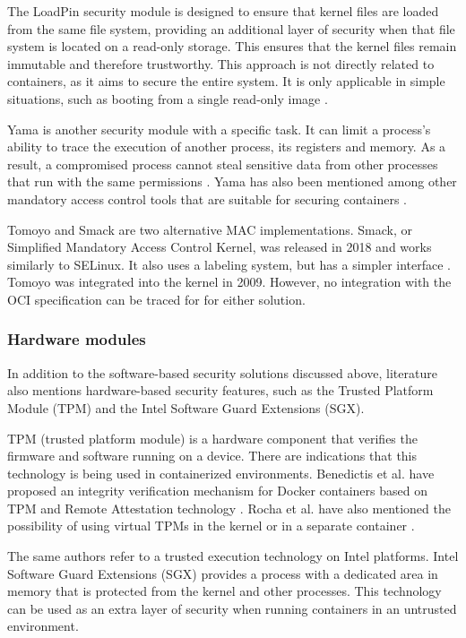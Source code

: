 The LoadPin security module is designed to ensure that kernel files are loaded from the same file system, providing an additional layer of security when that file system is located on a read-only storage. This ensures that the kernel files remain immutable and therefore trustworthy. This approach is not directly related to containers, as it aims to secure the entire system. It is only applicable in simple situations, such as booting from a single read-only image \cite{s:loadpin}.

Yama is another security module with a specific task. It can limit a process's ability to trace the execution of another process, its registers and memory. As a result, a compromised process cannot steal sensitive data from other processes that run with the same permissions \cite{s:lsm}. Yama has also been mentioned among other mandatory access control tools that are suitable for securing containers \cite{s:lsm}.

Tomoyo and Smack are two alternative MAC implementations. Smack, or Simplified Mandatory Access Control Kernel, was released in 2018 and works similarly to SELinux. It also uses a labeling system, but has a simpler interface \cite{d:kernelsmack}. Tomoyo was integrated into the kernel in 2009. However, no integration with the OCI specification can be traced for for either solution.

\subsubsection*{Hardware modules}

In addition to the software-based security solutions discussed above, literature also mentions hardware-based security features, such as the Trusted Platform Module (TPM) and the Intel Software Guard Extensions (SGX).

TPM (trusted platform module) is a hardware component that verifies the firmware and software running on a device. There are indications that this technology is being used in containerized environments. Benedictis et al. have proposed an integrity verification mechanism for Docker containers based on TPM and Remote Attestation technology \cite{sd:integrity}. Rocha et al. have also mentioned the possibility of using virtual TPMs in the kernel or in a separate container \cite{acm:14}.

The same authors refer to a trusted execution technology on Intel platforms. Intel Software Guard Extensions (SGX) provides a process with a dedicated area in memory that is protected from the kernel and other processes. This technology can be used as an extra layer of security when running containers in an untrusted environment.


